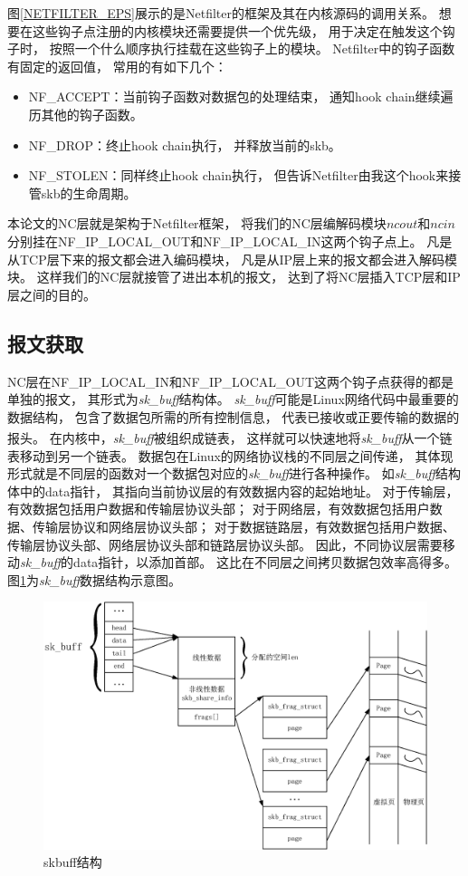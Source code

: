 \par
图\ref{NETFILTER_EPS}展示的是Netfilter的框架及其在内核源码的调用关系。
想要在这些钩子点注册的内核模块还需要提供一个优先级，
用于决定在触发这个钩子时，
按照一个什么顺序执行挂载在这些钩子上的模块。
Netfilter中的钩子函数有固定的返回值，
常用的有如下几个：
\begin{itemize}[leftmargin=.5in]
	\item NF\_ACCEPT：当前钩子函数对数据包的处理结束，
	通知hook chain继续遍历其他的钩子函数。
	\item NF\_DROP：终止hook chain执行，
	并释放当前的skb。
	\item NF\_STOLEN：同样终止hook chain执行，
	但告诉Netfilter由我这个hook来接管skb的生命周期。
\end{itemize}
本论文的NC层就是架构于Netfilter框架，
将我们的NC层编解码模块$ncout$和$ncin$分别挂在NF\_IP\_LOCAL\_OUT和NF\_IP\_LOCAL\_IN这两个钩子点上。
凡是从TCP层下来的报文都会进入编码模块，
凡是从IP层上来的报文都会进入解码模块。
这样我们的NC层就接管了进出本机的报文，
达到了将NC层插入TCP层和IP层之间的目的。
\subsection{报文获取}
NC层在NF\_IP\_LOCAL\_IN和NF\_IP\_LOCAL\_OUT这两个钩子点获得的都是单独的报文，
其形式为\emph{sk\_buff}结构体。
\emph{sk\_buff}可能是Linux网络代码中最重要的数据结构，
包含了数据包所需的所有控制信息，
代表已接收或正要传输的数据的报头\textsuperscript{\cite{linux网络技术内幕}}。
在内核中，\emph{sk\_buff}被组织成链表，
这样就可以快速地将\emph{sk\_buff}从一个链表移动到另一个链表。
数据包在Linux的网络协议栈的不同层之间传递，
其体现形式就是不同层的函数对一个数据包对应的\emph{sk\_buff}进行各种操作。
如\emph{sk\_buff}结构体中的data指针，
其指向当前协议层的有效数据内容的起始地址。
对于传输层，有效数据包括用户数据和传输层协议头部；
对于网络层，有效数据包括用户数据、传输层协议和网络层协议头部；
对于数据链路层，有效数据包括用户数据、传输层协议头部、网络层协议头部和链路层协议头部。
因此，不同协议层需要移动\emph{sk\_buff}的data指针，以添加首部。
这比在不同层之间拷贝数据包效率高得多。
图\ref{SKBUFFEPS}为\emph{sk\_buff}数据结构示意图。
\begin{figure}[htbp]
	\centering
	\includegraphics[width=6in]{figures/skbuff.eps}
	\caption{skbuff结构}
	\label{SKBUFFEPS}
\end{figure}

